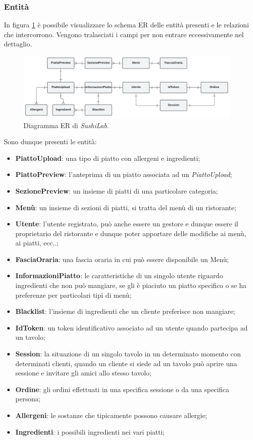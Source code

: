 \subsubsection{Entità}
In figura \ref{ER-sushilab} è possibile visualizzare lo schema ER delle entità presenti e le relazioni che intercorrono. Vengono tralasciati i campi per non entrare eccessivamente nel dettaglio.
\FloatBarrier
\begin{figure}[!ht]
\centering
\includegraphics[width=1\linewidth]{immagini/ER_sushilab.pdf}
\caption{Diagramma ER di \textit{SushiLab}.}
\label{ER-sushilab}
\end{figure}
\FloatBarrier
Sono dunque presenti le entità:
\begin{itemize}
  \item \textbf{PiattoUpload}: una tipo di piatto con allergeni e ingredienti;
  \item \textbf{PiattoPreview}: l'anteprima di un piatto associata ad un \textit{PiattoUpload};
  \item \textbf{SezionePreview}: un insieme di piatti di una particolare categoria;
  \item \textbf{Menù}: un insieme di sezioni di piatti, si tratta del menù di un ristorante;
  \item \textbf{Utente}: l'utente registrato, può anche essere un gestore e dunque essere il proprietario del ristorante e dunque poter apportare delle modifiche ai menù, ai piatti, ecc..;
  \item \textbf{FasciaOraria}: una fascia oraria in cui può essere disponibile un Menù;
  \item \textbf{InformazioniPiatto}: le caratteristiche di un singolo utente riguardo ingredienti che non può mangiare, se gli è piaciuto un piatto specifico o se ha preferenze per particolari tipi di menù;
  \item \textbf{Blacklist}: l'insieme di ingredienti che un cliente preferisce non mangiare;
  \item \textbf{IdToken}: un token identificativo associato ad un utente quando partecipa ad un tavolo;
  \item \textbf{Session}: la situazione di un singolo tavolo in un determinato momento con determinati clienti, quando un cliente si siede ad un tavolo può aprire una sessione e invitare gli amici allo stesso tavolo;
  \item \textbf{Ordine}: gli ordini effettuati in una specifica sessione o da una specifica persona;
  \item \textbf{Allergeni}: le sostanze che tipicamente possono causare allergie;
  \item \textbf{Ingredienti}: i possibili ingredienti nei vari piatti;
\end{itemize}
